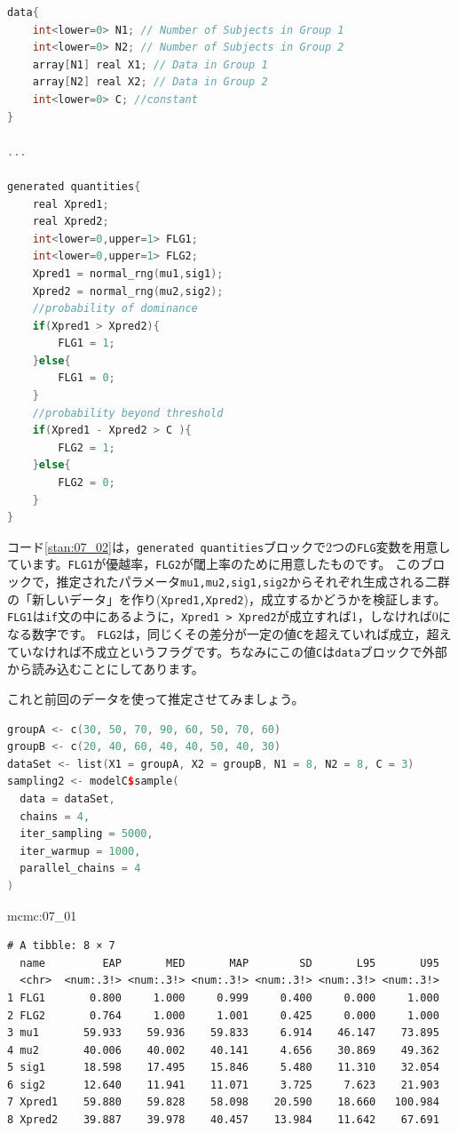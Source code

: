 \documentclass{ltjsbook}
\begin{document}
\begin{lstlisting}[language=C++,label={stan:07_02},caption={優越率や閾上率を計算するコード}]
data{
    int<lower=0> N1; // Number of Subjects in Group 1
    int<lower=0> N2; // Number of Subjects in Group 2
    array[N1] real X1; // Data in Group 1
    array[N2] real X2; // Data in Group 2
    int<lower=0> C; //constant 
}

...

generated quantities{
    real Xpred1;
    real Xpred2;
    int<lower=0,upper=1> FLG1;
    int<lower=0,upper=1> FLG2;
    Xpred1 = normal_rng(mu1,sig1);
    Xpred2 = normal_rng(mu2,sig2);
    //probability of dominance
    if(Xpred1 > Xpred2){
        FLG1 = 1;
    }else{
        FLG1 = 0;
    }
    //probability beyond threshold
    if(Xpred1 - Xpred2 > C ){
        FLG2 = 1;
    }else{
        FLG2 = 0;
    }
}
\end{lstlisting}
コード\ref{stan:07_02}は，\verb|generated quantities|ブロックで2つの\verb|FLG|変数を用意しています。\verb|FLG1|が優越率，\verb|FLG2|が閾上率のために用意したものです。
このブロックで，推定されたパラメータ\verb|mu1,mu2,sig1,sig2|からそれぞれ生成される二群の「新しいデータ」を作り(\verb|Xpred1,Xpred2|)，成立するかどうかを検証します。
\verb|FLG1|は\verb|if|文の中にあるように，\verb|Xpred1 > Xpred2|が成立すれば1，しなければ0になる数字です。
\verb|FLG2|は，同じくその差分が一定の値\verb|C|を超えていれば成立，超えていなければ不成立というフラグです。ちなみにこの値\verb|C|は\verb|data|ブロックで外部から読み込むことにしてあります。

これと前回のデータを使って推定させてみましょう。
\begin{lstlisting}[language=c++,label={code:07_03},caption={優越率，閾上率を推定するコード}]
groupA <- c(30, 50, 70, 90, 60, 50, 70, 60)
groupB <- c(20, 40, 60, 40, 40, 50, 40, 30)
dataSet <- list(X1 = groupA, X2 = groupB, N1 = 8, N2 = 8, C = 3)
sampling2 <- modelC$sample(
  data = dataSet,
  chains = 4,
  iter_sampling = 5000,
  iter_warmup = 1000,
  parallel_chains = 4
)
\end{lstlisting}

\begin{MCMCout}{}{mcmc:07_01}
	\begin{verbatim}
# A tibble: 8 × 7
  name         EAP       MED       MAP        SD       L95       U95
  <chr>  <num:.3!> <num:.3!> <num:.3!> <num:.3!> <num:.3!> <num:.3!>
1 FLG1       0.800     1.000     0.999     0.400     0.000     1.000
2 FLG2       0.764     1.000     1.001     0.425     0.000     1.000
3 mu1       59.933    59.936    59.833     6.914    46.147    73.895
4 mu2       40.006    40.002    40.141     4.656    30.869    49.362
5 sig1      18.598    17.495    15.846     5.480    11.310    32.054
6 sig2      12.640    11.941    11.071     3.725     7.623    21.903
7 Xpred1    59.880    59.828    58.098    20.590    18.660   100.984
8 Xpred2    39.887    39.978    40.457    13.984    11.642    67.691
\end{verbatim}
\end{MCMCout}
\end{document}
